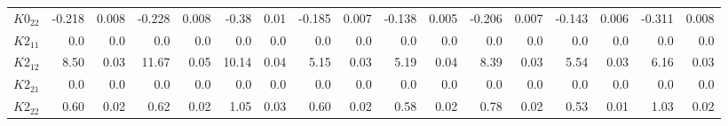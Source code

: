 \documentclass[../report/parameterReport.tex]{subfiles}
\begin{document}
\begin{landscape}
\begin{table}[tb]
\begin{center}
{\begin{tabular}{l|rr|rr|rr|rr|rr|rr|rr|rr}
$K0_{22}$ & -0.218 & 0.008 & -0.228 & 0.008 & -0.38 & 0.01 & -0.185 & 0.007 & -0.138 & 0.005 & -0.206 & 0.007 & -0.143 & 0.006 & -0.311 & 0.008\\
$K2_{11}$ & 0.0 & 0.0 & 0.0 & 0.0 & 0.0 & 0.0 & 0.0 & 0.0 & 0.0 & 0.0 & 0.0 & 0.0 & 0.0 & 0.0 & 0.0 & 0.0\\
$K2_{12}$ & 8.50 & 0.03 & 11.67 & 0.05 & 10.14 & 0.04 & 5.15 & 0.03 & 5.19 & 0.04 & 8.39 & 0.03 & 5.54 & 0.03 & 6.16 & 0.03\\
$K2_{21}$ & 0.0 & 0.0 & 0.0 & 0.0 & 0.0 & 0.0 & 0.0 & 0.0 & 0.0 & 0.0 & 0.0 & 0.0 & 0.0 & 0.0 & 0.0 & 0.0\\
$K2_{22}$ & 0.60 & 0.02 & 0.62 & 0.02 & 1.05 & 0.03 & 0.60 & 0.02 & 0.58 & 0.02 & 0.78 & 0.02 & 0.53 & 0.01 & 1.03 & 0.02\\
\end{tabular}
}
\end{center}
\end{table}
\end{landscape}
\end{document}
